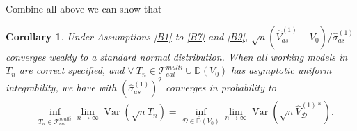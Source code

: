 \documentclass[11pt]{article}
\theoremstyle{referenceplain}
\newtheorem{corollary}{Corollary}[section]
\theoremstyle{referencedefinition}
\theoremstyle{referenceremark}
\begin{document}
    Combine all above we can show that
\begin{corollary}\label{corob5}
Under Assumptions \ref{B1} to \ref{B7} and \ref{B9}, $\sqrt{n}(\widehat{V}_{as}^{(1)}-V_0)/\widehat{\sigma}_{as}^{(1)}$ converges weakly to a standard normal distribution. When all working models in $T_n$ are correct specified, and $\forall ~T_n\in\mathcal{T}_{eal}^{multi}\cup \bar{\mathbb{D}}(V_0)$ has asymptotic uniform integrability, we have with $(\widehat{\sigma}_{as}^{(1)})^2$ converges in probability to 
\begin{align*}
    &\inf_{T_n\in\mathcal{T}_{eal}^{multi}}\lim_{n\to\infty}\operatorname{Var}(\sqrt{n}T_n)=\inf_{\mathcal{D}\in\bar{\mathbb{D}}(V_0)}\lim_{n\to\infty}\operatorname{Var}(\sqrt{n}\widehat{V}_{\mathcal{D}}^{(1)*}).
\end{align*}
\end{corollary}
\end{document}

